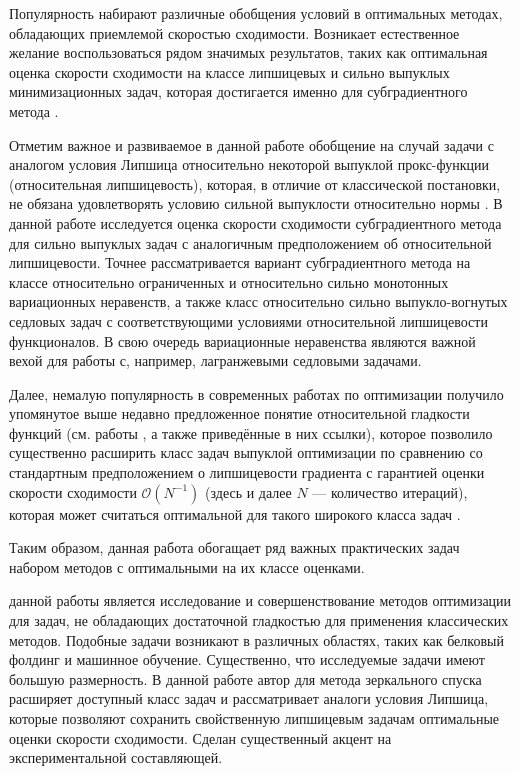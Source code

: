 Популярность набирают различные обобщения условий в оптимальных методах, обладающих приемлемой скоростью сходимости. Возникает естественное желание воспользоваться рядом значимых результатов, таких как оптимальная оценка скорости сходимости на классе липшицевых и сильно выпуклых минимизационных задач, которая достигается именно для субградиентного метода \cite{Bach_2012}. 

Отметим важное и развиваемое в данной работе обобщение на случай задачи с аналогом условия Липшица относительно некоторой выпуклой прокс-функции (относительная липшицевость), которая, в отличие от классической постановки, не обязана удовлетворять условию сильной выпуклости относительно нормы \cite{AdaMirr_2021,Lu_2018,Zhou_NIPS_2020}. В данной работе исследуется оценка скорости сходимости субградиентного метода для сильно выпуклых задач с аналогичным предположением об относительной липшицевости. Точнее рассматривается вариант субградиентного метода на классе относительно ограниченных и относительно сильно монотонных вариационных неравенств, а также класс относительно сильно выпукло-вогнутых седловых задач с соответствующими условиями относительной липшицевости функционалов. В свою очередь вариационные неравенства являются важной вехой для работы с, например, лагранжевыми седловыми задачами. 

Далее, немалую популярность в современных работах по оптимизации получило упомянутое выше недавно предложенное понятие относительной гладкости функций (см. работы \cite{Bauschke,Drag,Dragomir,Lu_Nesterov_2018}, а также приведённые в них ссылки), которое позволило существенно расширить класс задач выпуклой оптимизации по сравнению со стандартным предположением о липшицевости градиента с гарантией оценки скорости сходимости $\mathcal{O}(N^{-1})$ (здесь и далее $N$ --- количество итераций), которая может считаться оптимальной для такого широкого класса задач \cite{Dragomir}. 

Таким образом, данная работа обогащает ряд важных практических задач набором методов с оптимальными на их классе оценками.


{\aim}  данной работы является исследование и совершенствование методов оптимизации для задач, не обладающих достаточной гладкостью для применения классических методов. Подобные задачи возникают в различных областях, таких как белковый фолдинг и машинное обучение. Существенно, что исследуемые задачи имеют большую размерность. В данной работе автор для метода зеркального спуска расширяет доступный класс задач и рассматривает аналоги условия Липшица, которые позволяют сохранить свойственную липшицевым задачам оптимальные оценки скорости сходимости. Сделан существенный акцент на экспериментальной составляющей.

